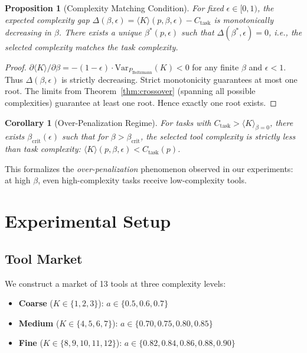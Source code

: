 \documentclass[12pt]{article}
\newtheorem{proposition}[theorem]{Proposition}
\newtheorem{corollary}[theorem]{Corollary}
\theoremstyle{definition}
\begin{document}
\begin{proposition}[Complexity Matching Condition]\label{prop:matching}
For fixed $\epsilon \in [0, 1)$, the expected complexity gap $\Delta(\beta, \epsilon) = \langle K \rangle(p, \beta, \epsilon) - C_{\mathrm{task}}$ is monotonically decreasing in $\beta$. There exists a unique $\beta^*(p, \epsilon)$ such that $\Delta(\beta^*, \epsilon) = 0$, i.e., the selected complexity matches the task complexity.
\end{proposition}

\begin{proof}
$\partial \langle K \rangle / \partial \beta = -(1-\epsilon) \cdot \mathrm{Var}_{P_{\mathrm{Boltzmann}}}(K) < 0$ for any finite $\beta$ and $\epsilon < 1$. Thus $\Delta(\beta, \epsilon)$ is strictly decreasing. Strict monotonicity guarantees at most one root. The limits from Theorem~\ref{thm:crossover} (spanning all possible complexities) guarantee at least one root. Hence exactly one root exists.
\end{proof}

\begin{corollary}[Over-Penalization Regime]\label{cor:over-penalization}
For tasks with $C_{\mathrm{task}} > \langle K \rangle_{\beta=0}$, there exists $\beta_{\mathrm{crit}}(\epsilon)$ such that for $\beta > \beta_{\mathrm{crit}}$, the selected tool complexity is \emph{strictly less} than task complexity: $\langle K \rangle(p, \beta, \epsilon) < C_{\mathrm{task}}(p)$.
\end{corollary}

This formalizes the \emph{over-penalization} phenomenon observed in our experiments: at high $\beta$, even high-complexity tasks receive low-complexity tools.

\section{Experimental Setup}

\subsection{Tool Market}

We construct a market of 13 tools at three complexity levels:
\begin{itemize}
  \item \textbf{Coarse} ($K \in \{1,2,3\}$): $a \in \{0.5, 0.6, 0.7\}$
  \item \textbf{Medium} ($K \in \{4,5,6,7\}$): $a \in \{0.70, 0.75, 0.80, 0.85\}$
  \item \textbf{Fine} ($K \in \{8,9,10,11,12\}$): $a \in \{0.82, 0.84, 0.86, 0.88, 0.90\}$
\end{itemize}
\end{document}
